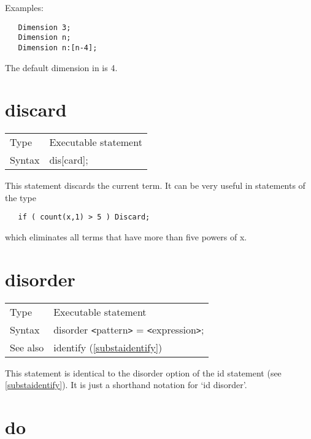\noindent Examples:
\begin{verbatim}
   Dimension 3;
   Dimension n;
   Dimension n:[n-4];
\end{verbatim}
The default dimension in {\FORM} is 4. \vspace{10mm}


\section{discard}
\label{substadiscard}

\noindent \begin{tabular}{ll}
Type & Executable statement\\
Syntax & dis[card];
\end{tabular} \vspace{4mm}

\noindent This statement discards the current term. It can 
be very useful in statements of the type
\begin{verbatim}
   if ( count(x,1) > 5 ) Discard;
\end{verbatim}
which eliminates all terms that have more than five powers of x. 
\vspace{10mm}


\section{disorder}
\label{substadisorder}

\noindent \begin{tabular}{ll}
Type & Executable statement \\
Syntax & disorder {\tt<}pattern{\tt>} = {\tt<}expression{\tt>};
\\ See also & identify (\ref{substaidentify})
\end{tabular} \vspace{4mm}

\noindent This statement is identical to the disorder 
option of the id 
statement (see \ref{substaidentify}). It is just a shorthand notation for 
`id disorder'. \vspace{10mm}


\section{do}
\label{substado}

